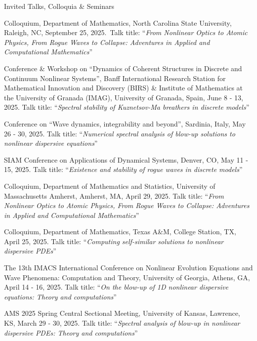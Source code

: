 \documentclass[10pt]{article} %
\begin{document}
\begin{section}{Invited Talks, Colloquia \& Seminars}
\begin{etaremune}
\item Colloquium, Department of Mathematics, North Carolina State University, Raleigh, NC, September 25, 2025.~Talk title: ``\textit{From Nonlinear Optics to Atomic Physics, From Rogue Waves to Collapse:
Adventures in Applied and Computational Mathematics}''

\item Conference \& Workshop on ``Dynamics of Coherent Structures in Discrete and Continuum Nonlinear Systems'', Banff International
Research Station for Mathematical Innovation and Discovery (BIRS) \& Institute of Mathematics at the
University of Granada (IMAG), University of Granada, Spain, June 8 - 13, 2025. Talk title:
 ``\textit{Spectral stability of Kuznetsov-Ma breathers in discrete models}''

\item Conference on ``Wave dynamics, integrability and beyond'', Sardinia, Italy, May 26 - 30, 2025.
Talk title: ``\textit{Numerical spectral analysis of blow-up solutions to nonlinear dispersive equations}''

\item SIAM Conference on Applications of Dynamical Systems, Denver, CO, May 11 - 15, 2025.
Talk title: ``\textit{Existence and stability of rogue waves in discrete models}''

\item Colloquium, Department of Mathematics and Statistics, University of Massachusetts Amherst, Amherst, MA, April 29, 2025.
Talk title: ``\textit{From Nonlinear Optics to Atomic Physics, From Rogue Waves to Collapse:
Adventures in Applied and Computational Mathematics}''

\item Colloquium, Department of Mathematics, Texas A\&M, College Station, TX, April 25, 2025.
Talk title: ``\textit{Computing self-similar solutions to nonlinear dispersive PDEs}''

\item The 13th IMACS International Conference on Nonlinear Evolution Equations and Wave Phenomena: Computation and Theory, %
        University of Georgia, Athens, GA, April 14 - 16, 2025.
        Talk title: ``\textit{On the blow-up of 1D nonlinear dispersive equations: Theory and computations}''

\item AMS 2025 Spring Central Sectional Meeting, University of Kansas, Lawrence, KS, March 29 - 30, 2025.
Talk title: ``\textit{Spectral analysis of blow-up in nonlinear dispersive PDEs: Theory and computations}''


\end{etaremune}
\end{section}
\end{document}
